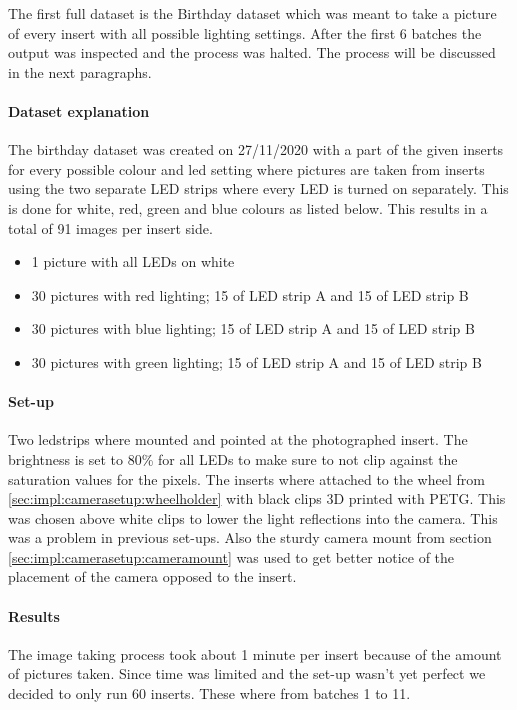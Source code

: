 			The first full dataset is the Birthday dataset which was meant to take a picture of every insert with all possible lighting settings. After the first 6 batches the output was inspected and the process was halted. The process will be discussed in the next paragraphs.
		

			\paragraph{Dataset explanation}
			The birthday dataset was created on 27/11/2020 with a part of the given inserts for every possible colour and led setting where pictures are taken from inserts using the two separate LED strips where every LED is turned on separately. This is done for white, red, green and blue colours as listed below. This results in a total of 91 images per insert side.

			\begin{itemize}
				\item 1 picture with all LEDs on white
				\item 30 pictures with red lighting; 15 of LED strip A and 15 of LED strip B
				\item 30 pictures with blue lighting; 15 of LED strip A and 15 of LED strip B
				\item 30 pictures with green lighting; 15 of LED strip A and 15 of LED strip B
			\end{itemize}



			\paragraph{Set-up}
			Two ledstrips where mounted and pointed at the photographed insert. The brightness is set to 80\% for all LEDs to make sure to not clip against the saturation values for the pixels. The inserts where attached to the wheel from \ref{sec:impl:camerasetup:wheelholder} with black clips 3D printed with PETG. This was chosen above white clips to lower the light reflections into the camera. This was a problem in previous set-ups.
			Also the sturdy camera mount from section \ref{sec:impl:camerasetup:cameramount} was used to get better notice of the placement of the camera opposed to the insert. 

			\paragraph{Results}
			The image taking process took about 1 minute per insert because of the amount of pictures taken. Since time was limited and the set-up wasn't yet perfect we decided to only run 60 inserts. These where from batches 1 to 11. 

